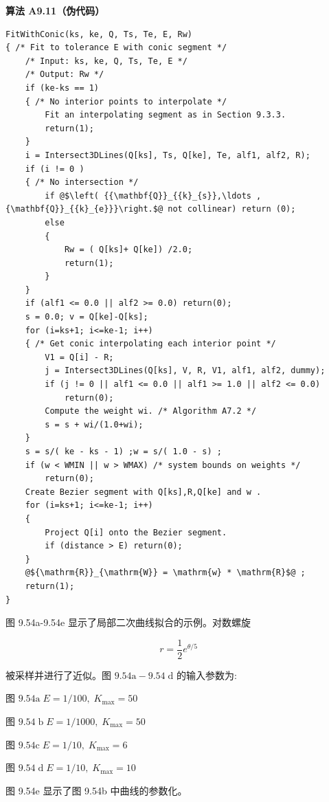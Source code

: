 \documentclass[../main.tex]{subfiles}
\begin{document}
\par\medskip\noindent\textbf{算法 A9.11（伪代码）}\par
\begin{verbatim}
FitWithConic(ks, ke, Q, Ts, Te, E, Rw)
{ /* Fit to tolerance E with conic segment */
    /* Input: ks, ke, Q, Ts, Te, E */
    /* Output: Rw */
    if (ke-ks == 1)
    { /* No interior points to interpolate */
        Fit an interpolating segment as in Section 9.3.3.
        return(1);
    }
    i = Intersect3DLines(Q[ks], Ts, Q[ke], Te, alf1, alf2, R);
    if (i != 0 )
    { /* No intersection */
        if @$\left( {{\mathbf{Q}}_{{k}_{s}},\ldots ,{\mathbf{Q}}_{{k}_{e}}}\right.$@ not collinear) return (0);
        else
        {
            Rw = ( Q[ks]+ Q[ke]) /2.0;
            return(1);
        }
    }
    if (alf1 <= 0.0 || alf2 >= 0.0) return(0);
    s = 0.0; v = Q[ke]-Q[ks];
    for (i=ks+1; i<=ke-1; i++)
    { /* Get conic interpolating each interior point */
        V1 = Q[i] - R;
        j = Intersect3DLines(Q[ks], V, R, V1, alf1, alf2, dummy);
        if (j != 0 || alf1 <= 0.0 || alf1 >= 1.0 || alf2 <= 0.0)
            return(0);
        Compute the weight wi. /* Algorithm A7.2 */
        s = s + wi/(1.0+wi);
    }
    s = s/( ke - ks - 1) ;w = s/( 1.0 - s) ;
    if (w < WMIN || w > WMAX) /* system bounds on weights */
        return(0);
    Create Bezier segment with Q[ks],R,Q[ke] and w .
    for (i=ks+1; i<=ke-1; i++)
    {
        Project Q[i] onto the Bezier segment.
        if (distance > E) return(0);
    }
    @${\mathrm{R}}_{\mathrm{W}} = \mathrm{w} * \mathrm{R}$@ ;
    return(1);
}
\end{verbatim}

图 9.54a-9.54e 显示了局部二次曲线拟合的示例。对数螺旋

\[
r = \frac{1}{2}{e}^{\theta /5}
\]

被采样并进行了近似。图 \({9.54}\mathrm{a} - {9.54}\mathrm{\;d}\) 的输入参数为:

图 \({9.54}\mathrm{a}\;E = 1/{100},\;{K}_{\max } = {50}\)

图 \({9.54}\mathrm{\;b}\;E = 1/{1000},\;{K}_{\max } = {50}\)

图 \({9.54}\mathrm{c}\;E = 1/{10},\;{K}_{\max } = 6\)

图 \({9.54}\mathrm{\;d}\;E = 1/{10},\;{K}_{\max } = {10}\)

图 9.54e 显示了图 9.54b 中曲线的参数化。
\end{document}
